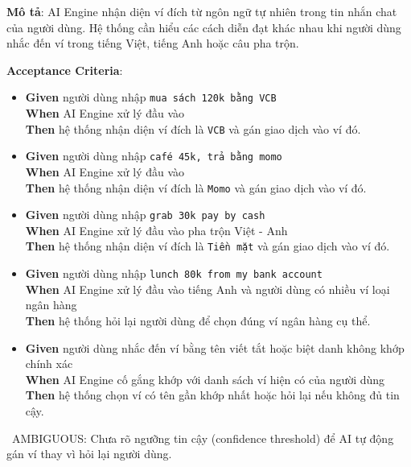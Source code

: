 \textbf{Mô tả}: AI Engine nhận diện ví đích từ ngôn ngữ tự nhiên trong tin nhắn chat của người dùng. Hệ thống cần hiểu các cách diễn đạt khác nhau khi người dùng nhắc đến ví trong tiếng Việt, tiếng Anh hoặc câu pha trộn.



\textbf{Acceptance Criteria}:

\begin{itemize}
\item \textbf{Given} người dùng nhập \texttt{mua sách 120k bằng VCB}  \\ \hspace*{1.5em}  \textbf{When} AI Engine xử lý đầu vào  \\ \hspace*{1.5em}  \textbf{Then} hệ thống nhận diện ví đích là \texttt{VCB} và gán giao dịch vào ví đó.
\item \textbf{Given} người dùng nhập \texttt{café 45k, trả bằng momo}  \\ \hspace*{1.5em}  \textbf{When} AI Engine xử lý đầu vào  \\ \hspace*{1.5em}  \textbf{Then} hệ thống nhận diện ví đích là \texttt{Momo} và gán giao dịch vào ví đó.
\item \textbf{Given} người dùng nhập \texttt{grab 30k pay by cash}  \\ \hspace*{1.5em}  \textbf{When} AI Engine xử lý đầu vào pha trộn Việt - Anh  \\ \hspace*{1.5em}  \textbf{Then} hệ thống nhận diện ví đích là \texttt{Tiền mặt} và gán giao dịch vào ví đó.
\item \textbf{Given} người dùng nhập \texttt{lunch 80k from my bank account}  \\ \hspace*{1.5em}  \textbf{When} AI Engine xử lý đầu vào tiếng Anh và người dùng có nhiều ví loại ngân hàng  \\ \hspace*{1.5em}  \textbf{Then} hệ thống hỏi lại người dùng để chọn đúng ví ngân hàng cụ thể.
\item \textbf{Given} người dùng nhắc đến ví bằng tên viết tắt hoặc biệt danh không khớp chính xác  \\ \hspace*{1.5em}  \textbf{When} AI Engine cố gắng khớp với danh sách ví hiện có của người dùng  \\ \hspace*{1.5em}  \textbf{Then} hệ thống chọn ví có tên gần khớp nhất hoặc hỏi lại nếu không đủ tin cậy.
\end{itemize}
\warningicon\  AMBIGUOUS: Chưa rõ ngưỡng tin cậy (confidence threshold) để AI tự động gán ví thay vì hỏi lại người dùng.




